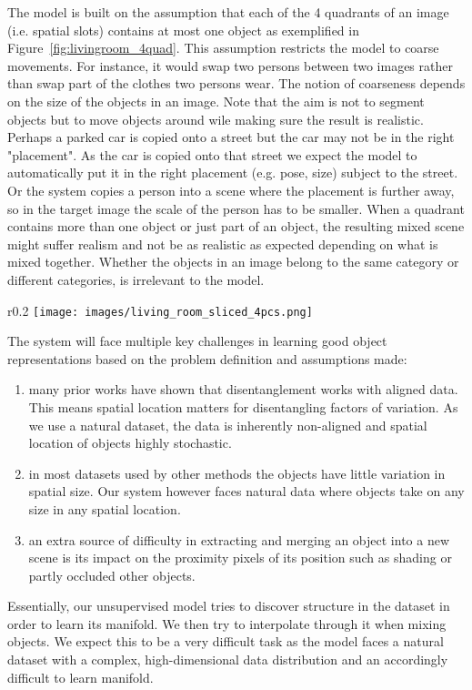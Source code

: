 \documentclass[12pt,a4paper]{article}
\begin{document}
The model is built on the assumption that each of the 4 quadrants of an image (i.e. spatial slots) contains at most one object as exemplified in Figure~\ref{fig:livingroom_4quad}. This assumption restricts the model to coarse movements. For instance, it would swap two persons between two images rather than swap part of the clothes two persons wear. The notion of coarseness depends on the size of the objects in an image. Note that the aim is not to segment objects but to move objects around wile making sure the result is realistic. Perhaps a parked car is copied onto a street but the car may not be in the right "placement". As the car is copied onto that street we expect the model to automatically put it in the right placement (e.g. pose, size) subject to the street. Or the system copies a person into a scene where the placement is further away, so in the target image the scale of the person has to be smaller. When a quadrant contains more than one object or just part of an object, the resulting mixed scene might suffer realism and not be as realistic as expected depending on what is mixed together. Whether the objects in an image belong to the same category or different categories, is irrelevant to the model.

\begin{wrapfigure}{r}{0.2\textwidth}
\texttt{[image: images/living\_room\_sliced\_4pcs.png]} 
\caption{4 quadrants.} %
\label{fig:livingroom_4quad}
\end{wrapfigure}

The system will face multiple key challenges in learning good object representations based on the problem definition and assumptions made:
\begin{enumerate}
  \item many prior works have shown that disentanglement works with aligned data. This means spatial location matters for disentangling factors of variation. As we use a natural dataset, the data is inherently non-aligned and spatial location of objects highly stochastic.
  \item  in most datasets used by other methods the objects have little variation in spatial size. Our system however faces natural data where objects take on any size in any spatial location.
  \item an extra source of difficulty in extracting and merging an object into a new scene is its impact on the proximity pixels of its position such as shading or partly occluded other objects.
\end{enumerate}
Essentially, our unsupervised model tries to discover structure in the dataset in order to learn its manifold. We then try to interpolate through it when mixing objects. We expect this to be a very difficult task as the model faces a natural dataset with a complex, high-dimensional data distribution and an accordingly difficult to learn manifold. 
\end{document}
